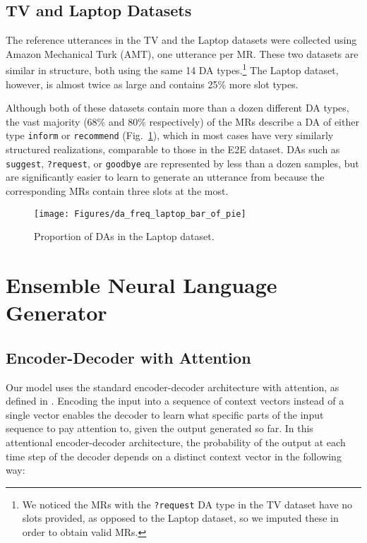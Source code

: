 \documentclass[11pt,a4paper]{article}
\begin{document}
\subsection{TV and Laptop Datasets}

The reference utterances in the TV and the Laptop datasets were collected using Amazon Mechanical Turk (AMT), one utterance per MR. These two datasets are similar in structure, both using the same 14 DA types.\footnote{We noticed the MRs with the \texttt{?request} DA type in the TV dataset have no slots provided, as opposed to the Laptop dataset, so we imputed these in order to obtain valid MRs.} The Laptop dataset, however, is almost twice as large and contains 25\% more slot types.


Although both of these datasets contain more than a dozen different DA types, the vast majority (68\% and 80\% respectively) of the MRs describe a DA of either type \texttt{inform} or \texttt{recommend} (Fig.~\ref{fig:da_freq_laptop}), which in most cases have very similarly structured realizations, comparable to those in the E2E dataset. DAs such as \texttt{suggest}, \texttt{?request}, or \texttt{goodbye} are represented by less than a dozen samples, but are significantly easier to learn to generate an utterance from because the corresponding MRs contain three slots at the most. 

\begin{figure}
  \begin{center}
  	\texttt{[image: Figures/da\_freq\_laptop\_bar\_of\_pie]}
  \end{center}
  \vspace{-0.5cm}
  \caption{Proportion of DAs in the Laptop dataset.}
  \label{fig:da_freq_laptop}
\end{figure}



\section{Ensemble Neural Language Generator}
\label{model}


\subsection{Encoder-Decoder with Attention}

Our model uses the standard encoder-decoder architecture with attention, as defined in \citet{bahdanau2015neural}. Encoding the input into a sequence of context vectors instead of a single vector enables the decoder to learn what specific parts of the input sequence to pay attention to, given the output generated so far. In this attentional encoder-decoder architecture, the probability of the output at each time step  of the decoder depends on a distinct context vector  in the following way:
\end{document}
